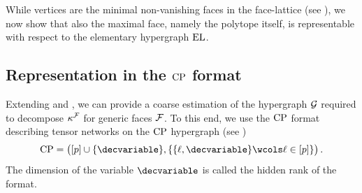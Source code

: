 


While vertices are the minimal non-vanishing faces in the face-lattice (see \cite{ziegler_lectures_2013}), we now show that also the maximal face, namely the polytope itself, is representable with respect to the elementary hypergraph $\mathrm{EL}$.



\subsection{Representation in the $\mathrm{CP}$ format}

Extending  and , we can provide a coarse estimation of the hypergraph $\mathcal{G}$ required to decompose $\kappa^{\mathcal{F}}$ for generic faces $\mathcal{F}$.
To this end, we use the $\mathrm{CP}$ format describing tensor networks on the $\mathrm{CP}$ hypergraph (see )
\begin{align*}
    \cpformat
    = \big([\seldim]\cup\{\decvariable\},\{\{\selindex,\decvariable\}\wcols\selindexin\}\big) \, .
\end{align*}
The dimension of the variable $\decvariable$ is called the hidden rank of the format.

